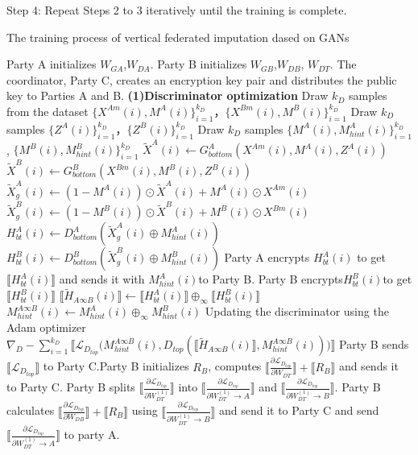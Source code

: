\documentclass[final,1p,times]{elsarticle}
\begin{document}
Step 4: Repeat Steps 2 to 3 iteratively until the training is complete.
\begin{algorithm}
	\caption{The training process of vertical federated imputation dased on GANs}
	\label{alg1}
	\algrenewcommand{}
	\algrenewcommand{}
	\begin{algorithmic}[1]
		\Require \small Party A initializes $W_{GA}$,$W_{DA}$. Party B initializes $W_{GB}$,$W_{DB}$, $W_{DT}$.
		\Ensure \small The coordinator, Party C, creates an encryption key pair and distributes the public key to Parties A and B.
		\State \textbf{(1)Discriminator optimization}
		\State  Draw $k_D$ samples from the dataset $\{X^{Am} (i), M^A (i)\}_{i=1}^{k_D}$，$\{X^{Bm} (i), M^B (i)\}_{i=1}^{k_D}$
		\State Draw $k_D$ samples $\{Z^A (i)\}_{i=1}^{k_D}$，$\{Z^B (i)\}_{i=1}^{k_D}$
		\State Draw $k_D$ samples $\{M^A (i), M_{hint}^A (i)\}_{i=1}^{k_D}$, $\{M^B (i), M_{hint}^B (i)\}_{i=1}^{k_D}$
		\State $\tilde{X}^A (i) \leftarrow G_{bottom}^A (X^{Am} (i), M^A (i), Z^A (i))$
		\State $\tilde{X}^B (i) \leftarrow G_{bottom}^B (X^{Bm} (i), M^B (i), Z^B (i))$
		\State $\tilde{X}_g^A (i) \leftarrow (1 - M^A (i)) \odot \tilde{X}^A (i) + M^A (i) \odot X^{Am} (i)$
		\State $\tilde{X}_g^B (i) \leftarrow (1 - M^B (i)) \odot \tilde{X}^B (i) + M^B (i) \odot X^{Bm} (i)$
		\State $H_{bt}^A (i) \leftarrow D_{bottom}^A (\tilde{X}_g^A (i) \oplus M_{hint}^A (i))$
		\State $H_{bt}^B (i) \leftarrow D_{bottom}^B (\tilde{X}_g^B (i) \oplus M_{hint}^B (i))$
		\State Party A encrypts $H_{bt}^A (i)$ to get $\llbracket H_{bt}^A(i) \rrbracket$ and sends it with $M_{hint}^A (i)$to Party B. Party B encrypts$H_{bt}^B (i)$to get $\llbracket H_{bt}^B(i) \rrbracket$
		\State $\llbracket \tilde{H}_{A \infty B} (i) \rrbracket \leftarrow \llbracket H_{bt}^A (i) \rrbracket \oplus_{\infty} \llbracket H_{bt}^B (i) \rrbracket$
		\State $M_{hint}^{A \infty B} (i) \leftarrow M_{hint}^A (i) \oplus_{\infty} M_{hint}^B (i)$
		\EndFor
		\State Updating the discriminator using the Adam optimizer
		\State $\nabla_D - \sum_{i=1}^{k_D} \llbracket \mathcal{L}_{D_{top}} \big( M_{hint}^{A \infty B} (i), D_{top} (\llbracket \tilde{H}_{A \infty B} (i) \rrbracket, M_{hint}^{A \infty B} (i)) \big) \rrbracket$
		\State Party B sends $\llbracket\mathcal{L}_{{D}_{{top}}}\rrbracket$  to Party C.Party B initializes $R_B$, computes $\llbracket \frac{\partial \mathcal{L}_{D_{{top}}}}{\partial W_{DT}} \rrbracket + \llbracket R_B \rrbracket$ and sends it to Party C. Party B splits $\llbracket \frac{\partial \mathcal{L}_{D_{top}}}{\partial W_{DT}^{(1)}} \rrbracket$ into $\llbracket \frac{\partial \mathcal{L}_{D_{top}}}{\partial W_{DT}^{(1)} \to A} \rrbracket$ and $\llbracket \frac{\partial \mathcal{L}_{D_{top}}}{\partial W_{DT}^{(1)} \to B} \rrbracket$. Party B calculates $\llbracket \frac{\partial \mathcal{L}_{D_{top}}}{\partial W_{DB}} \rrbracket + \llbracket R_B \rrbracket$ using $\llbracket \frac{\partial \mathcal{L}_{D_{top}}}{\partial W_{DT}^{(1)} \to B} \rrbracket$ and send it to Party C and send $\llbracket \frac{\partial \mathcal{L}_{D_{top}}}{\partial W_{DT}^{(1)} \to A} \rrbracket$ to party A.

\end{algorithmic}
\end{algorithm}
\end{document}
